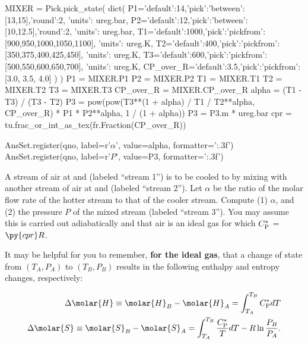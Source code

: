 \begin{pycode}
MIXER = Pick.pick_state(
    dict(
        P1={'default':14,'pick':{'between':[13,15],'round':2}, 'units': ureg.bar},
        P2={'default':12,'pick':{'between':[10,12.5],'round':2}, 'units': ureg.bar},
        T1={'default':1000,'pick':{'pickfrom':[900,950,1000,1050,1100]}, 'units': ureg.K},
        T2={'default':400,'pick':{'pickfrom':[350,375,400,425,450]}, 'units': ureg.K},
        T3={'default':600,'pick':{'pickfrom':[500,550,600,650,700]}, 'units': ureg.K},
        CP_over_R={'default':3.5,'pick':{'pickfrom':[3.0, 3.5, 4.0]}}
    )
)
P1 = MIXER.P1
P2 = MIXER.P2
T1 = MIXER.T1
T2 = MIXER.T2
T3 = MIXER.T3
CP_over_R = MIXER.CP_over_R
alpha = (T1 - T3) / (T3 - T2)
P3 = pow(pow(T3**(1 + alpha) / T1 / T2**alpha, CP_over_R) * P1 * P2**alpha, 1 / (1 + alpha))
P3 = P3.m * ureg.bar
cpr = tu.frac_or_int_as_tex(fr.Fraction(CP_over_R))

AnsSet.register(qno, label=r'\(\alpha\)', value=alpha, formatter='{:.3f}')
AnsSet.register(qno, label=r'\(P\)', value=P3, formatter='{:.3f}')
\end{pycode}
A stream of air at  and  (labeled ``stream 1'') is to be cooled to  by mixing with another stream of air at  and  (labeled ``stream 2'').  Let $\alpha$ be the ratio of the molar flow rate of the hotter stream to that of the cooler stream.  Compute (1) $\alpha$, and (2) the pressure $P$ of the mixed stream (labeled ``stream 3'').  You may assume this is carried out adiabatically and that air is an ideal gas for which $C^*_{\rm P}$ = $\py{cpr}R$.

It may be helpful for you to remember, {\bf for the ideal gas}, that a change of state from $(T_A,P_A)$ to $(T_B,P_B)$ results in the following enthalpy and entropy changes, respectively:

\begin{align*}
\Delta \molar{H} \equiv \molar{H}_B-\molar{H}_A = \int_{T_A}^{T_B} C^*_{\rm P} dT\\
\Delta \molar{S} \equiv \molar{S}_B-\molar{S}_A = \int_{T_A}^{T_B} \frac{C^*_{\rm P}}{T} dT - R \ln\frac{P_B}{P_A}.
\end{align*}

\ifshowsolutions\Solutionheader


